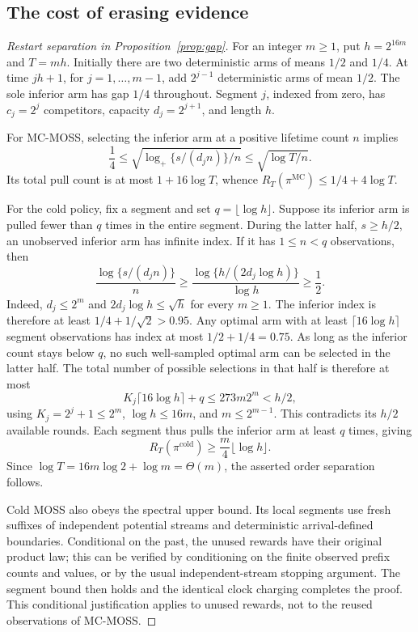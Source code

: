 \subsection{The cost of erasing evidence}
\begin{proof}[Restart separation in Proposition~\ref{prop:gap}]
For an integer $m\ge1$, put $h=2^{16m}$ and $T=mh$. Initially there are two deterministic arms of means $1/2$ and $1/4$. At time $jh+1$, for $j=1,\ldots,m-1$, add $2^{j-1}$ deterministic arms of mean $1/2$. The sole inferior arm has gap $1/4$ throughout. Segment $j$, indexed from zero, has $c_j=2^j$ competitors, capacity $d_j=2^{j+1}$, and length $h$.

For MC-MOSS, selecting the inferior arm at a positive lifetime count $n$ implies
\[
 \frac14\le\sqrt{\log_+\{s/(d_jn)\}/n}\le\sqrt{\log T/n}.
\]
Its total pull count is at most $1+16\log T$, whence $R_T(\pi^{\mathrm{MC}})\le1/4+4\log T$.

For the cold policy, fix a segment and set $q=\lfloor\log h\rfloor$. Suppose its inferior arm is pulled fewer than $q$ times in the entire segment. During the latter half, $s\ge h/2$, an unobserved inferior arm has infinite index. If it has $1\le n<q$ observations, then
\begin{equation}\label{eq:cold-low-count}
 \frac{\log\{s/(d_jn)\}}n
 \ge\frac{\log\{h/(2d_j\log h)\}}{\log h}\ge\frac12.
\end{equation}
Indeed, $d_j\le2^m$ and $2d_j\log h\le\sqrt h$ for every $m\ge1$. The inferior index is therefore at least $1/4+1/\sqrt2>0.95$. Any optimal arm with at least $\lceil16\log h\rceil$ segment observations has index at most $1/2+1/4=0.75$. As long as the inferior count stays below $q$, no such well-sampled optimal arm can be selected in the latter half. The total number of possible selections in that half is therefore at most
\[
 K_j\lceil16\log h\rceil+q\le273m2^m<h/2,
\]
using $K_j=2^j+1\le2^m$, $\log h\le16m$, and $m\le2^{m-1}$. This contradicts its $h/2$ available rounds. Each segment thus pulls the inferior arm at least $q$ times, giving
\[
 R_T(\pi^{\mathrm{cold}})\ge\frac m4\lfloor\log h\rfloor.
\]
Since $\log T=16m\log2+\log m=\Theta(m)$, the asserted order separation follows.

Cold MOSS also obeys the spectral upper bound. Its local segments use fresh suffixes of independent potential streams and deterministic arrival-defined boundaries. Conditional on the past, the unused rewards have their original product law; this can be verified by conditioning on the finite observed prefix counts and values, or by the usual independent-stream stopping argument. The segment bound then holds and the identical clock charging completes the proof. This conditional justification applies to unused rewards, not to the reused observations of MC-MOSS.
\end{proof}

